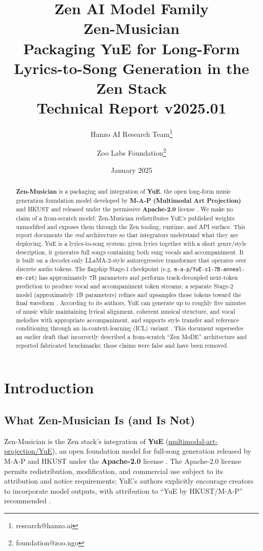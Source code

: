 \documentclass[11pt,a4paper]{article}
\title{
    \vspace{-2cm}
    \Large \textbf{Zen AI Model Family} \\
    \vspace{0.5cm}
    \Huge \textbf{Zen-Musician} \\
    \vspace{0.3cm}
    \large Packaging YuE for Long-Form Lyrics-to-Song Generation in the Zen Stack \\
    \vspace{0.5cm}
    \normalsize Technical Report v2025.01
}
\author{
    Hanzo AI Research Team\thanks{research@hanzo.ai} \and
    Zoo Labs Foundation\thanks{foundation@zoo.ngo}
}
\date{January 2025}
\begin{document}
\maketitle

\begin{abstract}
\textbf{Zen-Musician} is a packaging and integration of \textbf{YuE}, the open
long-form music generation foundation model developed by \textbf{M-A-P
(Multimodal Art Projection)} and HKUST and released under the permissive
\textbf{Apache-2.0} license \cite{yuan2025yue,yuehf}. We make no claim of a
from-scratch model: Zen-Musician redistributes YuE's published weights
unmodified and exposes them through the Zen tooling, runtime, and API surface.
This report documents the \emph{real} architecture so that integrators understand
what they are deploying. YuE is a lyrics-to-song system: given lyrics together
with a short genre/style description, it generates full songs containing both
sung vocals and accompaniment. It is built on a decoder-only LLaMA-2-style
autoregressive transformer that operates over discrete audio tokens. The flagship
Stage-1 checkpoint (e.g. \texttt{m-a-p/YuE-s1-7B-anneal-en-cot}) has
approximately 7B parameters and performs track-decoupled next-token prediction to
produce vocal and accompaniment token streams; a separate Stage-2 model
(approximately 1B parameters) refines and upsamples those tokens toward the final
waveform \cite{yuegh}. According to its authors, YuE can generate up to roughly
five minutes of music while maintaining lyrical alignment, coherent musical
structure, and vocal melodies with appropriate accompaniment, and supports style
transfer and reference conditioning through an in-context-learning (ICL) variant
\cite{yuan2025yue}. This document supersedes an earlier draft that incorrectly
described a from-scratch ``Zen MoDE'' architecture and reported fabricated
benchmarks; those claims were false and have been removed.
\end{abstract}

\tableofcontents
\newpage

\section{Introduction}

\subsection{What Zen-Musician Is (and Is Not)}

Zen-Musician is the Zen stack's integration of \textbf{YuE}
(\href{https://github.com/multimodal-art-projection/YuE}{multimodal-art-projection/YuE}),
an open foundation model for full-song generation released by M-A-P and HKUST
under the \textbf{Apache-2.0} license \cite{yuehf,yuan2025yue}. The Apache-2.0
license permits redistribution, modification, and commercial use subject to its
attribution and notice requirements; YuE's authors explicitly encourage creators
to incorporate model outputs, with attribution to ``YuE by HKUST/M-A-P''
recommended \cite{yuehf}.
\end{document}
